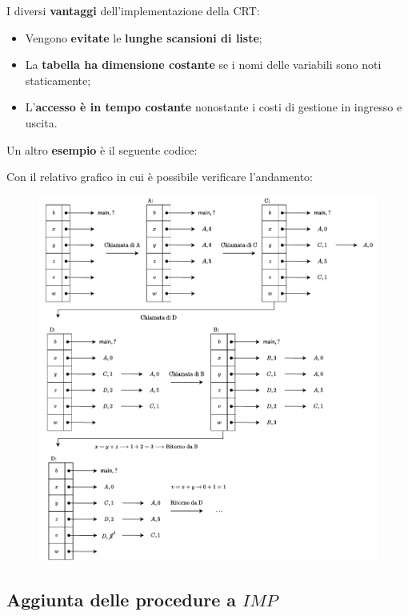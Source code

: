 \documentclass[a4paper]{article}
\begin{document}
	\noindent
	I diversi \textcolor{Green4}{\textbf{vantaggi}} dell'implementazione della CRT:
	\begin{itemize}
		\item Vengono \textbf{evitate} le \textbf{lunghe scansioni di liste};
		
		\item La \textbf{tabella ha dimensione costante} se i nomi delle variabili sono noti staticamente;
		
		\item L'\textbf{accesso è in tempo costante} nonostante i costi di gestione in ingresso e uscita.
	\end{itemize}
	Un altro \textcolor{Green4}{\textbf{esempio}} è il seguente codice:
	\newpage
	
	\noindent
	Con il relativo grafico in cui è possibile verificare l'andamento:	
	\begin{figure}[!htp]
		\centering
		\includegraphics[width=\textwidth]{img/CRT-ex1.pdf}
	\end{figure}\newpage
	
	\subsection{Aggiunta delle procedure a $IMP$}
	
\end{document}
